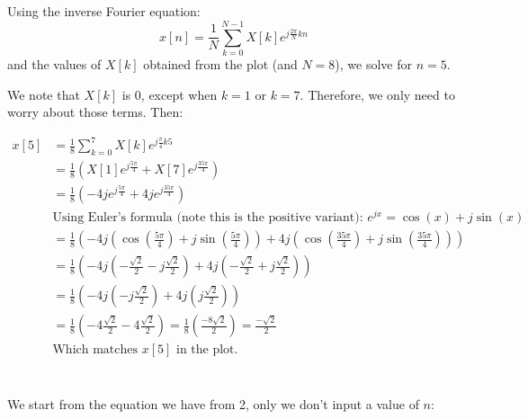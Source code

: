 \documentclass{article}
\begin{document}
\pagebreak
\section{}
Using the inverse Fourier equation: \[x[n] = \frac{1}{N}\sum_{k=0}^{N-1} X[k] e^{j\frac{2\pi}{N}kn}\]
and the values of $X[k]$ obtained from the plot (and $N = 8$), we solve for $n = 5$.

We note that $X[k]$ is 0, except when $k = 1$ or $k = 7$. Therefore, we only need to worry about those
terms. Then:

\begin{align*}
    x[5] &= \frac{1}{8}\sum_{k=0}^{7} X[k] e^{j\frac{\pi}{4}k5} \\
    &= \frac{1}{8}(X[1] e^{j\frac{5\pi}{4}} + X[7] e^{j\frac{35\pi}{4}}) \\
    &= \frac{1}{8}(-4j e^{j\frac{5\pi}{4}} + 4j e^{j\frac{35\pi}{4}}) \\
    &\textrm{Using Euler's formula (note this is the positive variant): } e^{jx} = \cos(x) + j\sin(x) \\
    &= \frac{1}{8}(-4j (\cos(\frac{5\pi}{4}) + j\sin(\frac{5\pi}{4}))
    + 4j (\cos(\frac{35\pi}{4}) + j\sin(\frac{35\pi}{4}))) \\
    &= \frac{1}{8}(-4j (-\frac{\sqrt{2}}{2} - j\frac{\sqrt{2}}{2})
    + 4j (-\frac{\sqrt{2}}{2} + j\frac{\sqrt{2}}{2})) \\
    &= \frac{1}{8}(-4j (-j\frac{\sqrt{2}}{2})
    + 4j (j\frac{\sqrt{2}}{2})) \\
    &= \frac{1}{8}(-4\frac{\sqrt{2}}{2}
    - 4\frac{\sqrt{2}}{2}) = \frac{1}{8}(\frac{-8\sqrt{2}}{2}) = \frac{-\sqrt{2}}{2} \\
    &\textrm{Which matches } x[5] \textrm{ in the plot.}
\end{align*}

\section{}
We start from the equation we have from 2, only we don't input a value of $n$:
\end{document}
